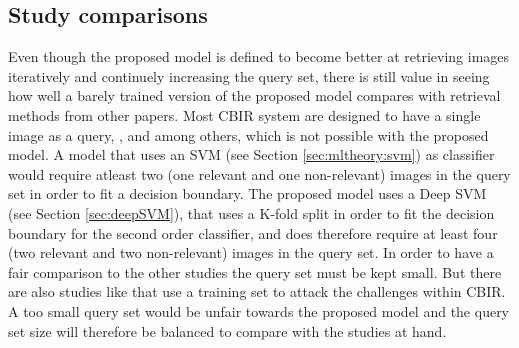 \subsection{Study comparisons}
\label{sec:meth:eval:studycomp}

Even though the proposed model is defined to become better at retrieving images iteratively and continuely increasing the query set, there is still value in seeing how well a barely trained version of the proposed model compares with retrieval methods from other papers. Most CBIR system are designed to have a single image as a query, \cite{wang2001simplicity}, \cite{subrahmanyam2013modified} and \cite{nagaraja2015low} among others, which is not possible with the proposed model. A model that uses an SVM (see Section \ref{sec:mltheory:svm}) as classifier would require atleast two (one relevant and one non-relevant) images in the query set in order to fit a decision boundary. The proposed model uses a Deep SVM (see Section \ref{sec:deepSVM}), that uses a K-fold split in order to fit the decision boundary for the second order classifier, and does therefore require at least four (two relevant and two non-relevant) images in the query set. In order to have a fair comparison to the other studies the query set must be kept small. But there are also studies like \cite{elalami2014new} that use a training set to attack the challenges within CBIR. A too small query set would be unfair towards the proposed model and the query set size will therefore be balanced to compare with the studies at hand.

